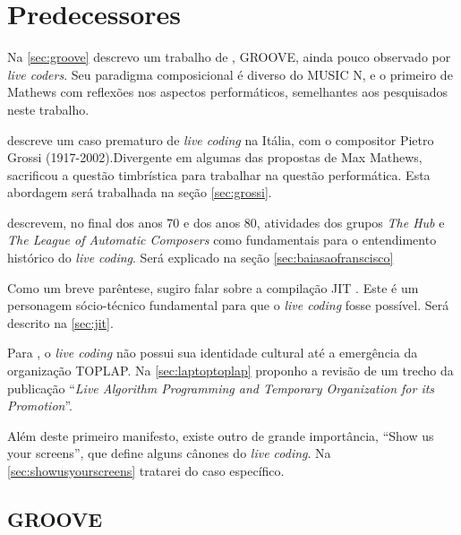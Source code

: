 

\section{Predecessores}

Na \autoref{sec:groove} descrevo um trabalho de , GROOVE, ainda pouco observado por \emph{live coders}. Seu paradigma composicional é diverso do MUSIC N, e o primeiro de Mathews com reflexões nos aspectos performáticos, semelhantes aos pesquisados neste trabalho.

  descreve um caso prematuro de \emph{live coding} na Itália, com o compositor Pietro Grossi (1917-2002).Divergente em algumas das propostas de Max Mathews, sacrificou a questão timbrística para trabalhar na questão performática. Esta abordagem será trabalhada na seção \autoref{sec:grossi}.

 descrevem, no final dos anos 70 e dos anos 80, atividades dos grupos \emph{The Hub} e \emph{The League of Automatic Composers} como fundamentais para o entendimento histórico do \emph{live coding}. Será explicado na seção \autoref{sec:baiasaofranscisco}

Como um breve parêntese, sugiro falar sobre a compilação JIT \cite{aycock_brief_2003}. Este é um personagem sócio-técnico fundamental para que o \emph{live coding} fosse possível. Será descrito na \autoref{sec:jit}.

Para , o \emph{live coding} não possui sua identidade cultural até a emergência da organização TOPLAP. Na \autoref{sec:laptoptoplap} proponho a revisão de um trecho da publicação ``\emph{Live Algorithm Programming and Temporary Organization for its Promotion}''.

Além deste primeiro manifesto, existe outro de grande importância, ``Show us your screens'', que define alguns cânones do \emph{live coding}. Na \autoref{sec:showusyourscreens} tratarei do caso específico.

\subsection{GROOVE}\label{sec:groove}

